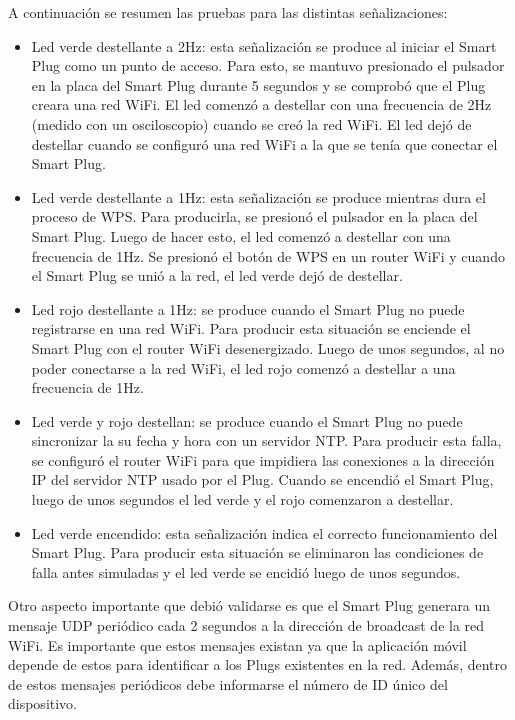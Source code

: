 A continuación se resumen las pruebas para las distintas señalizaciones:

\begin{itemize}
\item Led verde destellante a 2Hz: esta señalización se produce al iniciar el Smart Plug como un punto de acceso. Para esto, se mantuvo presionado el pulsador en la placa del Smart Plug durante 5 segundos y se comprobó que el Plug creara una red WiFi. El led comenzó a destellar con una frecuencia de 2Hz (medido con un osciloscopio) cuando se creó la red WiFi. El led dejó de destellar cuando se configuró una red WiFi a la que se tenía que conectar el Smart Plug.
\item Led verde destellante a 1Hz: esta señalización se produce mientras dura el proceso de WPS. Para producirla, se presionó el pulsador en la placa del Smart Plug. Luego de hacer esto, el led comenzó a destellar con una frecuencia de 1Hz. Se presionó el botón de WPS en un router WiFi y cuando el Smart Plug se unió a la red, el led verde dejó de destellar.
\item Led rojo destellante a 1Hz: se produce cuando el Smart Plug no puede registrarse en una red WiFi. Para producir esta situación se enciende el Smart Plug con el router WiFi desenergizado. Luego de unos segundos, al no poder conectarse a la red WiFi, el led rojo comenzó a destellar a una frecuencia de 1Hz.
\item Led verde y rojo destellan: se produce cuando el Smart Plug no puede sincronizar la su fecha y hora con un servidor NTP. Para producir esta falla, se configuró el router WiFi para que impidiera las conexiones a la dirección IP del servidor NTP usado por el Plug. Cuando se encendió el Smart Plug, luego de unos segundos el led verde y el rojo comenzaron a destellar.
\item Led verde encendido: esta señalización indica el correcto funcionamiento del Smart Plug. Para producir esta situación se eliminaron las condiciones de falla antes simuladas y el led verde se encidió luego de unos segundos.
\end{itemize}


Otro aspecto importante que debió validarse es que el Smart Plug generara un mensaje UDP periódico cada 2 segundos a la dirección de broadcast de la red WiFi. Es importante que estos mensajes existan ya que la aplicación móvil depende de estos para identificar a los Plugs existentes en la red. Además, dentro de estos mensajes periódicos debe informarse el número de ID único del dispositivo.

